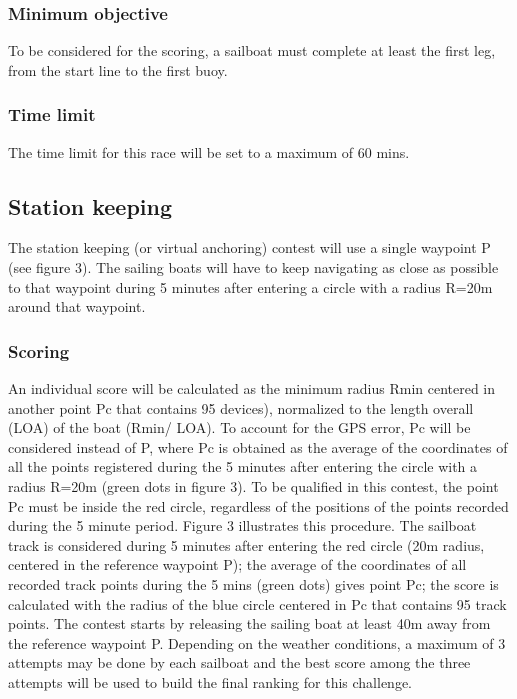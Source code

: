 \documentclass[12pt]{article}
\begin{document}
\subsubsection{Minimum objective}
To be considered for the scoring, a sailboat must complete at least the first
leg, from the start
line to the first buoy.

\subsubsection{Time limit}

The time limit for this race will be set to a maximum of 60 mins.

\subsection{Station keeping}
The station keeping (or virtual anchoring) contest will use a single waypoint P
(see figure 3).
The sailing boats will have to keep navigating as close as possible to that
waypoint during 5
minutes after entering a circle with a radius R=20m around that waypoint.

\subsubsection{Scoring}
An individual score will be calculated as the minimum radius Rmin centered in
another point Pc
that contains 95%
devices), normalized
to the length overall (LOA) of the boat (Rmin/ LOA). To account for the GPS
error, Pc will be
considered instead of P, where Pc is obtained as the average of the coordinates
of all the points
registered during the 5 minutes after entering the circle with a radius R=20m
(green dots in
figure 3). To be qualified in this contest, the point Pc must be inside the red
circle, regardless
of the positions of the points recorded during the 5 minute period.
Figure 3 illustrates this procedure. The sailboat track is considered during 5
minutes after
entering the red circle (20m radius, centered in the reference waypoint P); the
average of the
coordinates of all recorded track points during the 5 mins (green dots) gives
point Pc; the score
is calculated with the radius of the blue circle centered in Pc that contains
95%
track points. The contest starts by releasing the sailing boat at least 40m away
from the
reference waypoint P. Depending on the weather conditions, a maximum of 3
attempts may be
done by each sailboat and the best score among the three attempts will be used
to build the
final ranking for this challenge.
\end{document}
